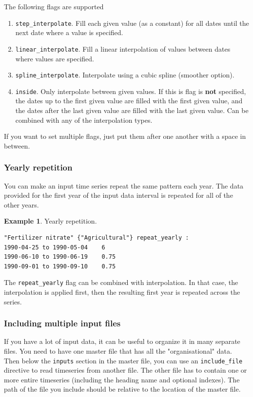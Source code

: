 \documentclass[11pt]{article}
\theoremstyle{definition}
\newtheorem{myexample}{Example}
\newenvironment{example}%
  {\begin{lrbox}{\examplebox}%
   \begin{minipage}{\dimexpr\linewidth-2\fboxsep}
   \begin{myexample}}%
  {\end{myexample}%
   \end{minipage}%
   \end{lrbox}%
   \begin{trivlist}
     \item[]\colorbox{silver}{\usebox\examplebox}
   \end{trivlist}}
\begin{document}
The following flags are supported
\begin{enumerate}
\item {\tt step\_interpolate}. Fill each given value (as a constant) for all dates until the next date where a value is specified.
\item {\tt linear\_interpolate}. Fill a linear interpolation of values between dates where values are specified.
\item {\tt spline\_interpolate}. Interpolate using a cubic spline (smoother option).
\item {\tt inside}. Only interpolate between given values. If this is flag is  {\bf not} specified, the dates up to the first given value are filled with the first given value, and the dates after the last given value are filled with the last given value. Can be combined with any of the interpolation types.
\end{enumerate}
If you want to set multiple flags, just put them after one another with a space in between.

\subsubsection{Yearly repetition}\label{sec:dat-yearly-repeat}

You can make an input time series repeat the same pattern each year. The data provided for the first year of the input data interval is repeated for all of the other years.

\begin{example}
Yearly repetition.
\begin{lstlisting}
"Fertilizer nitrate" {"Agricultural"} repeat_yearly :
1990-04-25 to 1990-05-04	6
1990-06-10 to 1990-06-19	0.75
1990-09-01 to 1990-09-10	0.75
\end{lstlisting}
\end{example}

The {\tt repeat\_yearly} flag can be combined with interpolation. In that case, the interpolation is applied first, then the resulting first year is repeated across the series.

\subsubsection{Including multiple input files}

If you have a lot of input data, it can be useful to organize it in many separate files. You need to have one master file that has all the "organisational" data. Then below the {\tt inputs} section in the master file, you can use an {\tt include\_file} directive to read timeseries from another file. The other file has to contain one or more entire timeseries (including the heading name and optional indexes). The path of the file you include should be relative to the location of the master file.
\end{document}
